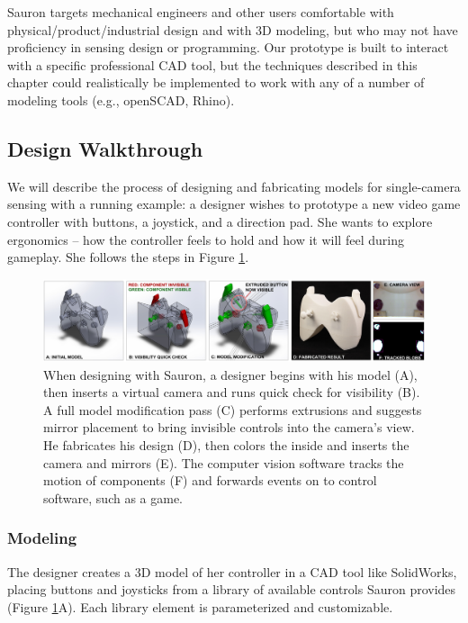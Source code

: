     Sauron targets mechanical engineers and other users comfortable with physical/product/industrial design and with 3D modeling, but who may not have proficiency in sensing design or programming. Our prototype is built to interact with a specific professional CAD tool, but the techniques described in this chapter could realistically be implemented to work with any of a number of modeling tools (e.g., openSCAD, Rhino).

    \subsection{Design Walkthrough}
    We will describe the process of designing and fabricating models for single-camera sensing with a running example: a designer wishes to prototype a new video game controller with buttons, a joystick, and a direction pad. She wants to explore ergonomics -- how the controller feels to hold and how it will feel during gameplay. She follows the steps in Figure \ref{fig:sauron-step-by-step}.
    
    
\begin{figure}
\centering
\includegraphics[width=\textwidth]{figures/sauron/fig2-process.jpg}
\caption{When designing with Sauron, a designer begins with his model (A), then inserts a virtual camera and runs quick check for visibility (B). A full model modification pass (C) performs extrusions and suggests mirror placement to bring invisible controls into the camera's view. He fabricates his design (D), then colors the inside and inserts the camera and mirrors (E). The computer vision software tracks the motion of components (F) and forwards events on to control software, such as a game.}
\label{fig:sauron-step-by-step}
\end{figure}


\subsubsection{Modeling} The designer creates a 3D model of her controller in a CAD tool like SolidWorks, placing buttons and joysticks from a library of available controls Sauron provides (Figure \ref{fig:sauron-step-by-step}A). Each library element is parameterized and customizable.

